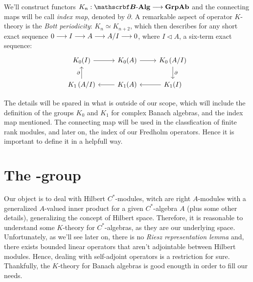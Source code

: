 We'll construct functors $K_n:\BAlg \longto \Ab{\Grp}$ and the connecting maps will be call \textit{index map}, denoted by $\partial$. A remarkable aspect of operator $K$-theory is the \textit{Bott periodicity}: $K_n \simeq K_{n+2}$, which then describes for any short exact sequence $0 \longrightarrow I \longrightarrow A \longrightarrow A/I \longrightarrow 0$, where $I\triangleleft A$, a six-term exact sequence:
\begin{equation*}
\begin{tikzcd}
K_0(I) \arrow[r]                                & K_0(A) \arrow[r] & K_0\left(A/I\right) \arrow[d, "\partial"] \\
K_1\left(A/I\right) \arrow[u, "\partial"] & K_1(A) \arrow[l] & K_1(I) \arrow[l]                               
\end{tikzcd}
\end{equation*}

The details will be spared in what is outside of our scope, which will include the definition of the groups $K_0$ and $K_1$ for complex Banach algebras, and the index map mentioned. The connecting map will be used in the classfication of finite rank modules, and later on, the index of our Fredholm operators. Hence it is important to define it in a helpfull way. 


\section[The \texorpdfstring{\ensuremath{K_0}}{K0} group]{The \texorpdfstring{}{K0}-group}
Our object is to deal with Hilbert $C^*$-modules, witch are right $A$-modules with a generalized $A$-valued inner product for a given $C^*$-algebra $A$ (plus some other details), generalizing the concept of Hilbert space. Therefore, it is reasonable to understand some $K$-theory for $C^*$-algebras, as they are our underlying space. Unfortunately, as we'll see later on, there is no \textit{Riesz representation lemma} and, there exists bounded linear operators that aren't adjointable between Hilbert modules. Hence, dealing with self-adjoint operators is a restriction for sure. Thankfully, the $K$-theory for Banach algebras is good enougth in order to fill our needs.

